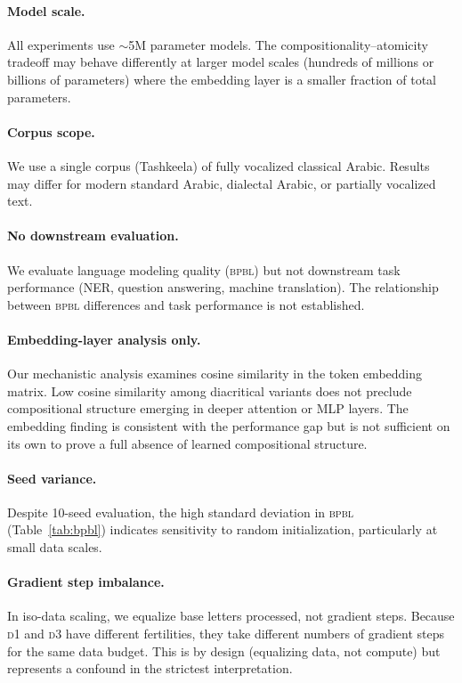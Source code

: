 \documentclass[11pt]{article}
\newcommand{\dOne}{\textsc{d1}}
\newcommand{\dThree}{\textsc{d3}}
\newcommand{\bpbl}{\textsc{bpbl}}
\begin{document}
\paragraph{Model scale.}
All experiments use $\sim$5M parameter models.
The compositionality--atomicity tradeoff may behave differently at larger model scales (hundreds of millions or billions of parameters) where the embedding layer is a smaller fraction of total parameters.

\paragraph{Corpus scope.}
We use a single corpus (Tashkeela) of fully vocalized classical Arabic.
Results may differ for modern standard Arabic, dialectal Arabic, or partially vocalized text.

\paragraph{No downstream evaluation.}
We evaluate language modeling quality (\bpbl{}) but not downstream task performance (NER, question answering, machine translation).
The relationship between \bpbl{} differences and task performance is not established.

\paragraph{Embedding-layer analysis only.}
Our mechanistic analysis examines cosine similarity in the token embedding matrix.
Low cosine similarity among diacritical variants does not preclude compositional structure emerging in deeper attention or MLP layers.
The embedding finding is consistent with the performance gap but is not sufficient on its own to prove a full absence of learned compositional structure.

\paragraph{Seed variance.}
Despite 10-seed evaluation, the high standard deviation in \bpbl{} (Table~\ref{tab:bpbl}) indicates sensitivity to random initialization, particularly at small data scales.

\paragraph{Gradient step imbalance.}
In iso-data scaling, we equalize base letters processed, not gradient steps.
Because \dOne{} and \dThree{} have different fertilities, they take different numbers of gradient steps for the same data budget.
This is by design (equalizing data, not compute) but represents a confound in the strictest interpretation.
\end{document}

